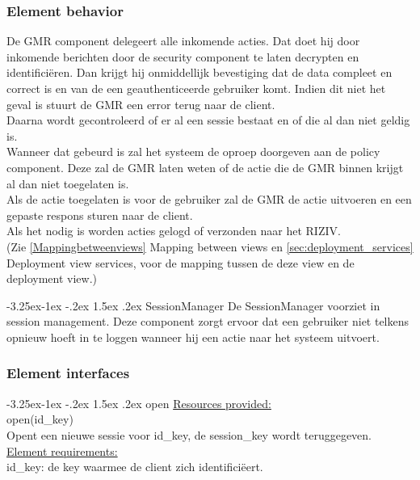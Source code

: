 \documentclass[a4paper,10pt]{article}
\makeatletter
\renewcommand\paragraph{\@startsection{paragraph}{4}{\z@}%
  {-3.25ex\@plus -1ex \@minus -.2ex}%
  {1.5ex \@plus .2ex}%
  {\normalfont\normalsize\bfseries}}
\makeatother
\begin{document}
\subsubsection*{Element behavior}
De GMR component delegeert alle inkomende acties.  Dat doet hij door inkomende berichten door de security component te laten decrypten en identifici\"{e}ren.  Dan krijgt hij onmiddellijk bevestiging dat de data compleet en correct is en van de een geauthenticeerde gebruiker komt.  Indien dit niet het geval is stuurt de GMR een error terug naar de client.\\
Daarna wordt gecontroleerd of er al een sessie bestaat en of die al dan niet geldig is.\\
Wanneer dat gebeurd is zal het systeem de oproep doorgeven aan de policy component.  Deze zal de GMR laten weten of de actie die de GMR binnen krijgt al dan niet toegelaten is.\\
Als de actie toegelaten is voor de gebruiker zal de GMR de actie uitvoeren en een gepaste respons sturen naar de client.\\
Als het nodig is worden acties gelogd of verzonden naar het RIZIV.\\
(Zie \ref{Mappingbetweenviews} Mapping between views en \ref{sec:deployment_services} Deployment view services, voor de mapping tussen de deze view en de deployment view.)


\paragraph{SessionManager}
De SessionManager voorziet in session management.  Deze component zorgt ervoor dat een gebruiker niet telkens opnieuw hoeft in te loggen wanneer hij een actie naar het systeem uitvoert.

\subsubsection*{Element interfaces} 

\paragraph{open}
\underline{Resources provided:}\\
open(id\_key)\\
Opent een nieuwe sessie voor id\_key, de session\_key wordt teruggegeven.\\

\underline{Element requirements:}\\
id\_key: de key waarmee de client zich identifici\"{e}ert.\\
\end{document}
